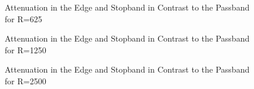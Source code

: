 \begin{figure}
    \centering
    
    \caption[Attenuation in the Edge and Stopband in Contrast to the Passband for R=625]{%
    Attenuation in the Edge and Stopband in Contrast to the Passband for R=625%
    }
    \label{fig:verification:fB5}
\end{figure}

\begin{figure}
    \centering
    
    \caption[Attenuation in the Edge and Stopband in Contrast to the Passband for R=1250]{%
    Attenuation in the Edge and Stopband in Contrast to the Passband for R=1250%
    }
    \label{fig:verification:fB5}
\end{figure}

\begin{figure}
    \centering
    
    \caption[Attenuation in the Edge and Stopband in Contrast to the Passband for R=2500]{%
    Attenuation in the Edge and Stopband in Contrast to the Passband for R=2500%
    }
    \label{fig:verification:fB5}
\end{figure}